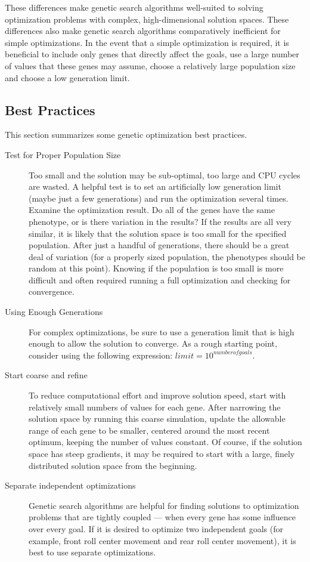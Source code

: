 These differences make genetic search algorithms well-suited to solving optimization problems with complex, high-dimensional solution spaces.  These differences also make genetic search algorithms comparatively inefficient for simple optimizations.  In the event that a simple optimization is required, it is beneficial to include only genes that directly affect the goals, use a large number of values that these genes may assume, choose a relatively large population size and choose a low generation limit.

\subsection{Best Practices} \label{ssec:bestPractices}

This section summarizes some genetic optimization best practices.

\begin{description}
\item[Test for Proper Population Size] Too small and the solution may be sub-optimal, too large and CPU cycles are wasted.  A helpful test is to set an artificially low generation limit (maybe just a few generations) and run the optimization several times.  Examine the optimization result.  Do all of the genes have the same phenotype, or is there variation in the results?  If the results are all very similar, it is likely that the solution space is too small for the specified population.  After just a handful of generations, there should be a great deal of variation (for a properly sized population, the phenotypes should be random at this point).  Knowing if the population is too small is more difficult and often required running a full optimization and checking for convergence.
\item[Using Enough Generations] For complex optimizations, be sure to use a generation limit that is high enough to allow the solution to converge.  As a rough starting point, consider using the following expression:  $limit = 10^{number of goals}$.
\item[Start coarse and refine] To reduce computational effort and improve solution speed, start with relatively small numbers of values for each gene.  After narrowing the solution space by running this coarse simulation, update the allowable range of each gene to be smaller, centered around the most recent optimum, keeping the number of values constant.  Of course, if the solution space has steep gradients, it may be required to start with a large, finely distributed solution space from the beginning.
\item[Separate independent optimizations] Genetic search algorithms are helpful for finding solutions to optimization problems that are tightly coupled --- when every gene has some influence over every goal.  If it is desired to optimize two independent goals (for example, front roll center movement and rear roll center movement), it is best to use separate optimizations.
\end{description}
